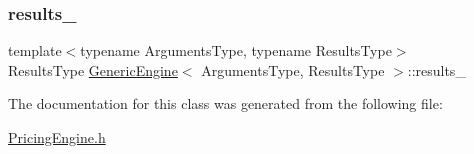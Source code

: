 \subsubsection{\texorpdfstring{results\+\_\+}{results\_}}
{\footnotesize\ttfamily template$<$typename Arguments\+Type, typename Results\+Type$>$ \\
Results\+Type \hyperlink{class_generic_engine}{Generic\+Engine}$<$ Arguments\+Type, Results\+Type $>$\+::results\+\_\+\hspace{0.3cm}{\ttfamily [mutable]}}



The documentation for this class was generated from the following file\+:\begin{DoxyCompactItemize}
\item 
\hyperlink{_pricing_engine_8h}{Pricing\+Engine.\+h}\end{DoxyCompactItemize}

